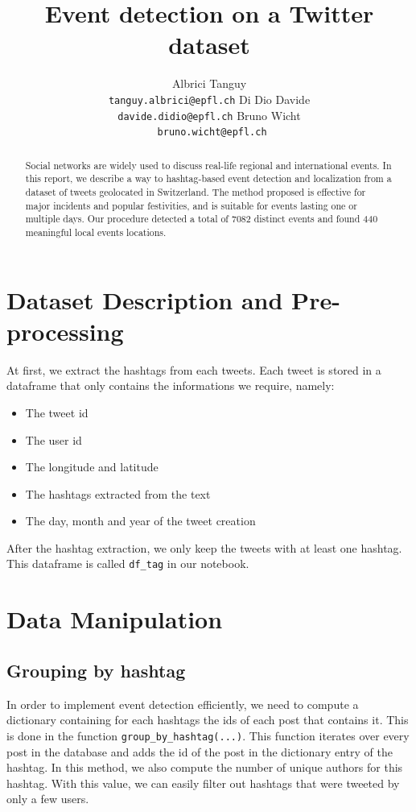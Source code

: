 \documentclass[11pt]{article}
\title{Event detection on a Twitter dataset}
\author{ 
  Albrici Tanguy \hspace{40px} \\
  {\tt tanguy.albrici@epfl.ch} \hspace{40px} \And
  Di Dio Davide \\
  {\tt davide.didio@epfl.ch} \And
   \hspace{40px} Bruno Wicht \\
{\tt \hspace{40px} bruno.wicht@epfl.ch} \\}
\date{}
\begin{document}
\maketitle
\begin{abstract}
Social networks are widely used to discuss real-life regional and international events. In this report, we describe a way to hashtag-based event detection and localization from a dataset of tweets geolocated in Switzerland. The method proposed is effective for major incidents and popular festivities, and is suitable for events lasting one or multiple days. Our  procedure detected a total of 7082 distinct events and found 440 meaningful local events locations.
\end{abstract}


\section{Dataset Description and Pre-processing}

At first, we extract the hashtags from each tweets. Each tweet is stored in a dataframe that only contains the informations we require, namely: 
\begin{itemize}

\item The tweet id 
\item The user id
\item The longitude and latitude
\item The hashtags extracted from the text
\item The day, month and year of the tweet creation

\end{itemize}

After the hashtag extraction, we only keep the tweets with at least one hashtag. This dataframe is called \texttt{df\_tag} in our notebook.

\section{Data Manipulation}


\subsection{Grouping by hashtag}

In order to implement event detection efficiently, we need to compute a dictionary containing for each hashtags the ids of each post that contains it. This is done in the function \texttt{group\_by\_hashtag(...)}. This function iterates over every post in the database and adds the id of the post in the dictionary entry of the hashtag. In this method, we also compute the number of unique authors for this hashtag. With this value, we can easily filter out hashtags that were tweeted by only a few users.
\end{document}
